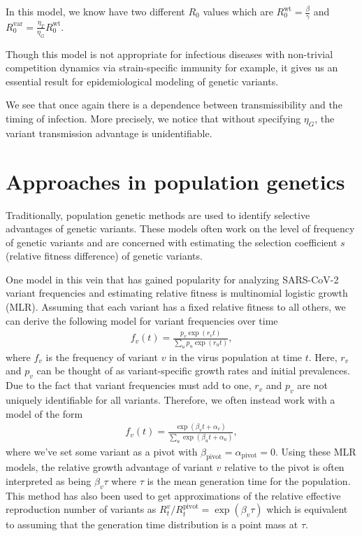 In this model, we know have two different $R_{0}$ values which are $R_{0}^{\text{wt}} = \frac{\beta}{\gamma}$ and $R_{0}^{\text{var}} = \frac{\eta_{T}}{\eta_{G}}R_{0}^{\text{wt}}$.

Though this model is not appropriate for infectious diseases with non-trivial competition dynamics via strain-specific immunity for example, it gives us an essential result for epidemiological modeling of genetic variants.

We see that once again there is a dependence between transmissibility and the timing of infection. 
More precisely, we notice that without specifying $\eta_{G}$, the variant transmission advantage is unidentifiable. 

\section{Approaches in population genetics}%

Traditionally, population genetic methods are used to identify selective advantages of genetic variants. 
These models often work on the level of frequency of genetic variants and are concerned with estimating the selection coefficient $s$ (relative fitness difference) of genetic variants.

One model in this vein that has gained popularity for analyzing SARS-CoV-2 variant frequencies and estimating relative fitness is multinomial logistic growth (MLR).
Assuming that each variant has a fixed relative fitness to all others, we can derive the following model for variant frequencies over time
\begin{align*}
f_{v}(t) = \frac{p_{v}\exp(r_{v}t)}{\sum_{u} p_{u} \exp(r_{u}t)},
\end{align*}
where $f_{v}$ is the frequency of variant $v$ in the virus population at time $t$.
Here, $r_{v}$ and $p_{v}$ can be thought of as variant-specific growth rates and initial prevalences. 
Due to the fact that variant frequencies must add to one, $r_{v}$ and $p_{v}$ are not uniquely identifiable for all variants. 
Therefore, we often instead work with a model of the form
\begin{align*}
f_{v}(t) = \frac{\exp(\beta_{v} t + \alpha_{v})}{\sum_{u} \exp(\beta_{u} t + \alpha_{u})},
\end{align*}
where we've set some variant as a pivot with $\beta_{\text{pivot}} = \alpha_{\text{pivot}}=0$.
Using these MLR models, the relative growth advantage of variant $v$ relative to the pivot is often interpreted as being $\beta_{v} \tau$ where $\tau$ is the mean generation time for the population.
This method has also been used to get approximations of the relative effective reproduction number of variants as $R_{t}^{v} / R_{t}^{\text{pivot}} = \exp(\beta_{v}\tau)$ which is equivalent to assuming that the generation time distribution is a point mass at $\tau$.

